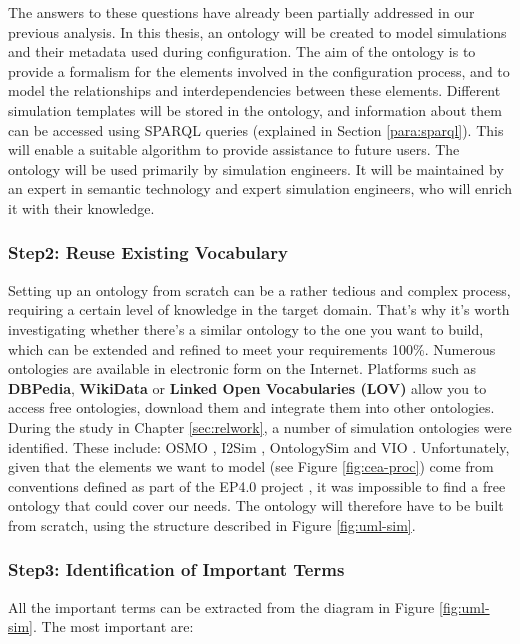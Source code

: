     The answers to these questions have already been partially addressed in our previous analysis. In this thesis, an ontology will be created to model simulations and their metadata used during configuration. The aim of the ontology is to provide a formalism for the elements involved in the configuration process, and to model the relationships and interdependencies between these elements. Different simulation templates will be stored in the ontology, and information about them can be accessed using SPARQL queries (explained in Section \ref{para:sparql}). This will enable a suitable algorithm to provide assistance to future users. The ontology will be used primarily by simulation engineers. It will be maintained by an expert in semantic technology and expert simulation engineers, who will enrich it with their knowledge.

    
    \subsubsection{Step2: Reuse Existing Vocabulary}
    Setting up an ontology from scratch can be a rather tedious and complex process, requiring a certain level of knowledge in the target domain. That's why it's worth investigating whether there's a similar ontology to the one you want to build, which can be extended and refined to meet your requirements 100\%. Numerous ontologies are available in electronic form on the Internet. Platforms such as \textbf{DBPedia}, \textbf{WikiData} or \textbf{Linked Open Vocabularies (LOV)} allow you to access free ontologies, download them and integrate them into other ontologies.\\
    
    During the study in Chapter \ref{sec:relwork}, a number of simulation ontologies were identified. These include: OSMO \cite{horsch2021osmo}, I2Sim \cite{grolinger2012ontology}, OntologySim \cite{may2022ontology} and VIO \cite{spelten2023simulation}. Unfortunately, given that the elements we want to model (see Figure \ref{fig:cea-proc}) come from conventions defined as part of the EP4.0 project \cite{assistSim}, it was impossible to find a free ontology that could cover our needs. The ontology will therefore have to be built from scratch, using the structure described in Figure \ref{fig:uml-sim}.


    \subsubsection{Step3: Identification of Important Terms}
    All the important terms can be extracted from the diagram in Figure \ref{fig:uml-sim}. The most important are:
    
